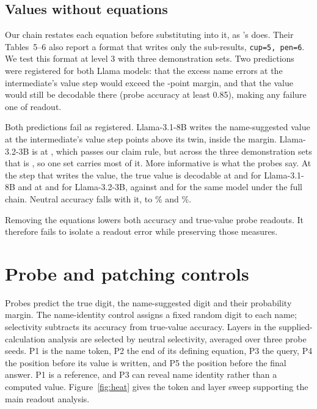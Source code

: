 \subsection{Values without equations}

\label{app:simple}

Our chain restates each equation before substituting into it, as
\citeauthor{kudo2026faithful}'s does. Their Tables~5--6 also report a format that writes only the
sub-results, \texttt{cup=5, pen=6}. We test this format
at level 3 with three demonstration sets. Two predictions were registered for both Llama models: that
the excess name errors at the intermediate's value step would exceed the -point
margin, and that the value would still be decodable there (probe accuracy at least 0.85), making
any failure one of readout.

Both predictions fail as registered. Llama-3.1-8B writes the name-suggested value at the intermediate's value
step  points above its twin, inside the margin. Llama-3.2-3B is at
, which passes our claim rule, but across the three demonstration sets that
is , so one set carries most of it. More informative is what the probes say. At
the step that writes the value, the true value is decodable at 
and  for Llama-3.1-8B and at
 and  for Llama-3.2-3B, against
 and  for the same model under the full
chain. Neutral accuracy falls with it, to \% and \%.

Removing the equations lowers both accuracy and true-value probe readouts. It therefore fails to isolate a readout error while preserving those measures.

\section{Probe and patching controls}
\label{app:sweeps}
\label{app:figs}



Probes predict the true digit, the name-suggested digit and their probability margin.
The name-identity control assigns a fixed random digit to each name; selectivity subtracts
its accuracy from true-value accuracy. Layers in the supplied-calculation analysis are
selected by neutral selectivity, averaged over three probe seeds.
P1 is the name token, P2 the end of its defining equation, P3 the query,
P4 the position before its value is written, and P5 the position before the final answer.
P1 is a reference, and P3 can reveal name identity rather than a computed value.
Figure~\ref{fig:heat} gives the token and layer sweep supporting the main readout analysis.


